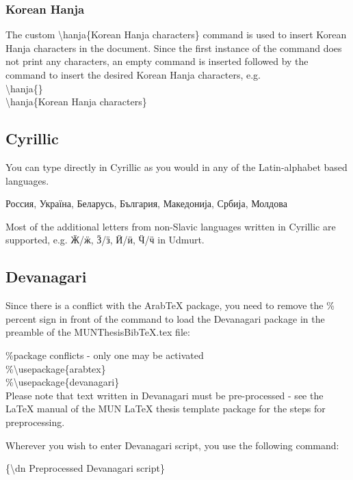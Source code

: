 \documentclass[12pt]{MUNThesisBibTeX}
\newcommand{\hanja}[1]{\begin{CJK}{UTF8}{bsmi}#1\end{CJK}}
\begin{document}
\subsubsection {Korean Hanja}
The custom \textbackslash hanja\{Korean Hanja characters\} command is used to insert Korean Hanja characters in the document. Since the first instance of the command does not print any characters, an empty command is inserted followed by the command to insert the desired Korean Hanja characters, e.g.\\

\textbackslash hanja\{\}\\
\textbackslash hanja\{Korean Hanja characters\}\\



\subsection{Cyrillic}
You can type directly in Cyrillic as you would in any of the Latin-alphabet based languages.\medskip

Россия, Україна, Беларусь, България, Македонија, Србија, Молдова\medskip

Most of the additional letters from non-Slavic languages written in Cyrillic are supported, e.g. Ӝ/ӝ, Ӟ/ӟ, Ӥ/ӥ, Ӵ/ӵ in Udmurt.

\subsection{Devanagari}

Since there is a conflict with the ArabTeX package, you need to remove the \% percent sign in front of the command to load the Devanagari package in the preamble of the MUNThesisBibTeX.tex file:

\%package conflicts - only one may be activated\\
\%\textbackslash usepackage\{arabtex\}\\
\%\textbackslash usepackage\{devanagari\}\\

Please note that text written in Devanagari must be pre-processed - see the LaTeX manual of the MUN LaTeX thesis template package for the steps for preprocessing. 

Wherever you wish to enter Devanagari script, you use the following command:

\{\textbackslash dn Preprocessed Devanagari script\}
\end{document}
